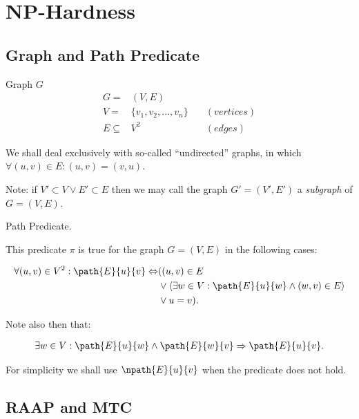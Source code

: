 \chapter{NP-Hardness}

\section{Graph and Path Predicate}

\begin{definition}
Graph $G$
\begin{align}
	\nonumber G = & (V,E) \\
	\nonumber V = & \{v_1, v_2, ..., v_n\} \quad & (vertices)\\
	\nonumber E \subseteq & V^2 & (edges)
\end{align}

We shall deal exclusively with so-called ``undirected'' graphs, in which $\forall (u,v) \in E : (u,v) = (v,u)$.

Note: if $V' \subset V \vee E' \subset E$ then we may call the graph $G'=(V',E')$ a \emph{subgraph} of $G=(V,E)$.
\end{definition}

\begin{definition}
Path Predicate.

This predicate $\pi$ is true for the graph $G=(V,E)$ in the following cases:

\begin{align}
	\nonumber \forall (u,v) \in V^2 : \path{E}{u}{v} \Leftrightarrow & ( (u, v) \in E \\
	\nonumber & \vee \langle \exists w \in V : \path{E}{u}{w} \wedge (w, v) \in E \rangle \\
	\nonumber & \vee u = v ).
\end{align}

Note also then that:

\begin{align}
	\nonumber \exists w \in V : \path{E}{u}{w} \wedge \path{E}{w}{v} \Rightarrow \path{E}{u}{v}.
\end{align}

For simplicity we shall use $\npath{E}{u}{v}$ when the predicate does not hold.

\end{definition}

\section{RAAP and MTC}

